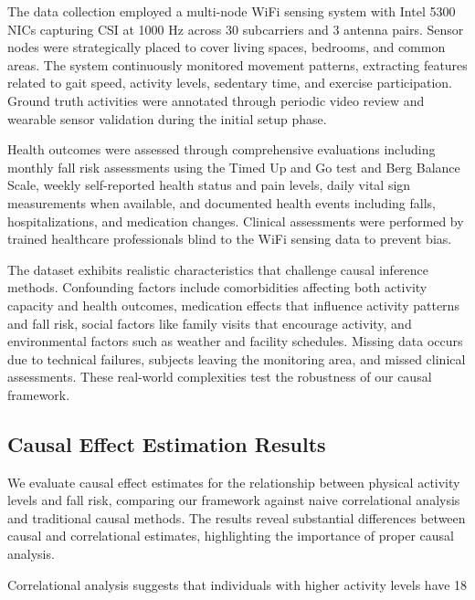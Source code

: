 \documentclass[journal]{IEEEtran}
\begin{document}
The data collection employed a multi-node WiFi sensing system with Intel 5300 NICs capturing CSI at 1000 Hz across 30 subcarriers and 3 antenna pairs. Sensor nodes were strategically placed to cover living spaces, bedrooms, and common areas. The system continuously monitored movement patterns, extracting features related to gait speed, activity levels, sedentary time, and exercise participation. Ground truth activities were annotated through periodic video review and wearable sensor validation during the initial setup phase.

Health outcomes were assessed through comprehensive evaluations including monthly fall risk assessments using the Timed Up and Go test and Berg Balance Scale, weekly self-reported health status and pain levels, daily vital sign measurements when available, and documented health events including falls, hospitalizations, and medication changes. Clinical assessments were performed by trained healthcare professionals blind to the WiFi sensing data to prevent bias.

The dataset exhibits realistic characteristics that challenge causal inference methods. Confounding factors include comorbidities affecting both activity capacity and health outcomes, medication effects that influence activity patterns and fall risk, social factors like family visits that encourage activity, and environmental factors such as weather and facility schedules. Missing data occurs due to technical failures, subjects leaving the monitoring area, and missed clinical assessments. These real-world complexities test the robustness of our causal framework.

\subsection{Causal Effect Estimation Results}

We evaluate causal effect estimates for the relationship between physical activity levels and fall risk, comparing our framework against naive correlational analysis and traditional causal methods. The results reveal substantial differences between causal and correlational estimates, highlighting the importance of proper causal analysis.

Correlational analysis suggests that individuals with higher activity levels have 18%
\end{document}
